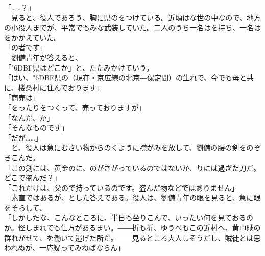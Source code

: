 \documentclass[
  paper=a5,
  fontsize=10pt,
  jafontsize=9.5pt,
  tate,                  %
  open_bracket_pos=nibu, %
]{jlreq}
\begin{document}
「……？」\\


　見ると、役人であろう、胸に県のをつけている。近頃はな世の中なので、地方の小役人までが、平常でもみな武装していた。二人のうち一名はを持ち、一名はをかかえていた。\\


「の者です」\\


　劉備青年が答えると、\\


「{\char"6DBF}県はどこか」と、たたみかけていう。\\


「はい、{\char"6DBF}県の（現在・京広線の北京―保定間）の生れで、今でも母と共に、楼桑村に住んでおります」\\


「商売は」\\


「をったりをつくって、売っておりますが」\\


「なんだ、か」\\


「そんなものです」\\


「だが……」\\


　と、役人は急にむさい物からのくように襟がみを放して、劉備の腰の剣をのぞきこんだ。\\


「この剣には、黄金のに、のがさがっているのではないか、りには過ぎた刀だ。どこで盗んだ？」\\


「これだけは、父ので持っているのです。盗んだ物などではありません」\\


　素直ではあるが、とした答えである。役人は、劉備青年の眼を見ると、急に眼をそらして、\\


「しかしだな、こんなところに、半日も坐りこんで、いったい何を見ておるのか。怪しまれても仕方があるまい。――折も折、ゆうべもこの近村へ、黄巾賊の群れがせて、を働いて逃げた所だ。――見るところ大人しそうだし、賊徒とは思われぬが、一応疑ってみねばならん」\\
\end{document}
